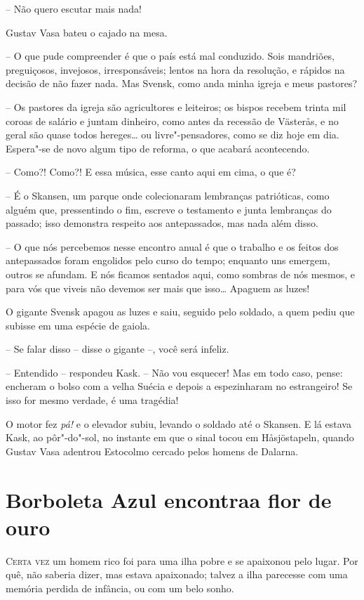 -- Não quero escutar mais nada!

Gustav Vasa bateu o cajado na mesa.

-- O que pude compreender é que o país está mal conduzido. Sois
mandriões, preguiçosos, invejosos, irresponsáveis; lentos na hora da
resolução, e rápidos na decisão de não fazer nada. Mas Svensk, como
anda minha igreja e meus pastores?

-- Os pastores da igreja são agricultores e leiteiros; os bispos recebem
trinta mil coroas de salário e juntam dinheiro, como antes da recessão
de Väster\r as, e no geral são quase todos hereges\ldots{} ou
livre"-pensadores, como se diz hoje em dia. Espera"-se de novo algum
tipo de reforma, o que acabará acontecendo.

-- Como?! Como?! E essa música, esse canto aqui em cima, o que é?

-- É o Skansen, um parque onde colecionaram lembranças patrióticas, como
alguém que, pressentindo o fim, escreve o testamento e junta lembranças
do passado; isso demonstra respeito aos antepassados, mas nada além
disso.

-- O que nós percebemos nesse encontro anual é que o trabalho e os feitos
dos antepassados foram engolidos pelo curso do tempo; enquanto uns
emergem, outros se afundam. E nós ficamos sentados aqui, como sombras
de nós mesmos, e para vós que viveis não devemos ser mais que isso\ldots{}
 Apaguem as luzes!

O gigante Svensk apagou as luzes e saiu, seguido pelo soldado, a quem
pediu que subisse em uma espécie de \mbox{gaiola.}

-- Se falar disso -- disse o gigante --, você será infeliz.

-- Entendido -- respondeu Kask. -- Não vou esquecer! Mas em todo caso,
pense: encheram o bolso com a velha Suécia e depois a espezinharam no
estrangeiro! Se isso for mesmo verdade, é uma tragédia!

O motor fez \textit{pá!} e o elevador subiu, levando o soldado até o
Skansen. E lá estava Kask, ao pôr"-do"-sol, no instante em que o
sinal tocou em H\r asjöstapeln, quando Gustav Vasa adentrou Estocolmo cercado pelos homens de \mbox{Dalarna.}

\chapter[Borboleta Azul encontra a flor de ouro]{Borboleta Azul encontra\break a flor de ouro}


\textsc{Certa vez} um homem rico foi para uma ilha pobre e se apaixonou pelo lugar.
Por quê, não saberia dizer, mas estava apaixonado; talvez a ilha
parecesse com uma memória perdida de infância, ou com um belo sonho.

